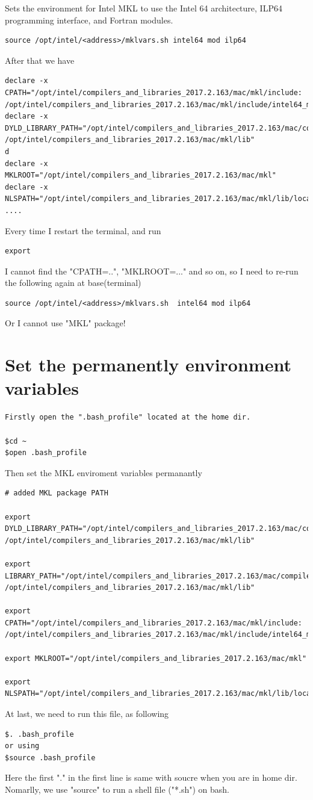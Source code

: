 Sets the environment for Intel MKL to use the Intel 64 architecture, ILP64 programming interface, and Fortran modules.
\begin{verbatim}
source /opt/intel/<address>/mklvars.sh intel64 mod ilp64
\end{verbatim}

After that we have 
\begin{verbatim}
declare -x CPATH="/opt/intel/compilers_and_libraries_2017.2.163/mac/mkl/include:
/opt/intel/compilers_and_libraries_2017.2.163/mac/mkl/include/intel64_mac/ilp64"
declare -x DYLD_LIBRARY_PATH="/opt/intel/compilers_and_libraries_2017.2.163/mac/compiler/lib:
/opt/intel/compilers_and_libraries_2017.2.163/mac/mkl/lib"
d
declare -x MKLROOT="/opt/intel/compilers_and_libraries_2017.2.163/mac/mkl"
declare -x NLSPATH="/opt/intel/compilers_and_libraries_2017.2.163/mac/mkl/lib/locale/%l_%t/%N"
....
\end{verbatim}

Every time I restart the terminal,  and run 
\begin{verbatim}
export
\end{verbatim}
I cannot find the "CPATH=..", "MKLROOT=..." and so on, so I need to re-run the following again at base(terminal)
\begin{verbatim}
source /opt/intel/<address>/mklvars.sh  intel64 mod ilp64
\end{verbatim}
Or I cannot use "MKL" package!

\section{Set the permanently environment variables}

\begin{verbatim}
Firstly open the ".bash_profile" located at the home dir. 

$cd ~
$open .bash_profile
\end{verbatim}

Then set the MKL enviroment variables permanantly

\begin{verbatim}
# added MKL package PATH

export DYLD_LIBRARY_PATH="/opt/intel/compilers_and_libraries_2017.2.163/mac/compiler/lib:
/opt/intel/compilers_and_libraries_2017.2.163/mac/mkl/lib"

export LIBRARY_PATH="/opt/intel/compilers_and_libraries_2017.2.163/mac/compiler/lib:
/opt/intel/compilers_and_libraries_2017.2.163/mac/mkl/lib"

export CPATH="/opt/intel/compilers_and_libraries_2017.2.163/mac/mkl/include:
/opt/intel/compilers_and_libraries_2017.2.163/mac/mkl/include/intel64_mac/ilp64"

export MKLROOT="/opt/intel/compilers_and_libraries_2017.2.163/mac/mkl"

export NLSPATH="/opt/intel/compilers_and_libraries_2017.2.163/mac/mkl/lib/locale/%l_%t/%N"

\end{verbatim}

At last, we need to run this file, as  following 

\begin{verbatim}
$. .bash_profile
or using
$source .bash_profile
\end{verbatim}

Here the first "." in the first line is same with soucre when you are in home dir.  Nomarlly, we use "source" to run a shell file ("*.sh") on bash.




